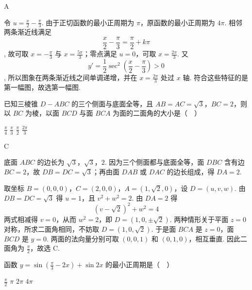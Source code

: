 \documentclass[UTF8,a4paper,oneside,11pt]{ctexbook}
\begin{document}
\begin{answer}
A
\end{answer}

\begin{solution}
令 \(u=\frac x2-\frac\pi3\). 由于正切函数的最小正周期为 \(\pi\)，原函数的最小正周期为 \(4\pi\). 相邻两条渐近线满足
\[
\frac x2-\frac\pi3=\frac\pi2+k\pi
\],
故可取 \(x=-\frac\pi3\) 与 \(x=\frac{5\pi}{3}\)；零点满足 \(u=0\)，可取 \(x=\frac{2\pi}{3}\). 又
\[
y'=\frac12\sec^{2}\left(\frac x2-\frac\pi3\right)>0
\],
所以图象在两条渐近线之间单调递增，并在 \(x=\frac{2\pi}{3}\) 处过 \(x\) 轴. 符合这些特征的是第一幅图，故选第一幅图.
\end{solution}

\begin{problem}
已知三棱锥 \(D - ABC\) 的三个侧面与底面全等，且 \(AB = AC = \sqrt{3}\)，\(BC = 2\)，则以 \(BC\) 为棱，以面 \(BCD\) 与面 \(BCA\) 为面的二面角的大小是（\(\quad\)）

\choices
    {\(\frac{\pi}{4}\)}
    {\(\frac{\pi}{3}\)}
    {\(\frac{\pi}{2}\)}
    {\(\frac{2\pi}{3}\)}

\end{problem}

\begin{answer}
C
\end{answer}

\begin{solution}
底面 \(ABC\) 的边长为 \(\sqrt3\)，\(\sqrt3\)，\(2\). 因为三个侧面都与底面全等，面 \(DBC\) 含有边 \(BC=2\)，故 \(DB=DC=\sqrt3\)；再由面 \(DAB\) 或 \(DAC\) 的边长组成，得 \(DA=2\).

取坐标 \(B=(0,0,0)\)，\(C=(2,0,0)\)，\(A=(1,\sqrt2,0)\)，设 \(D=(u,v,w)\). 由 \(DB=DC=\sqrt3\) 得 \(u=1\)，且 \(v^2+w^2=2\). 由 \(DA=2\) 得
\[
(v-\sqrt2)^2+w^2=4
\]
两式相减得 \(v=0\)，从而 \(w^2=2\)，即 \(D=(1,0,\pm\sqrt2)\). 两种情形关于平面 \(z=0\) 对称，所求二面角相同，不妨取 \(D=(1,0,\sqrt2)\). 于是面 \(BCA\) 是 \(z=0\)，面 \(BCD\) 是 \(y=0\). 两面的法向量分别可取 \((0,0,1)\) 和 \((0,1,0)\)，相互垂直. 因此二面角为 \(\frac\pi2\)，故选 C.
\end{solution}

\begin{problem}
函数 \(y = \sin \left(\frac{\pi}{3} - 2x\right) + \sin 2x\) 的最小正周期是（\(\quad\)）

\choices
    {\(\frac{\pi}{2}\)}
    {\(\pi\)}
    {\(2\pi\)}
    {\(4\pi\)}

\end{problem}
\end{document}
